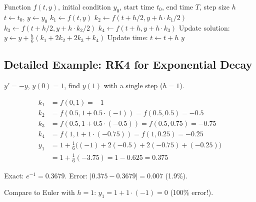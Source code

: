 \begin{algorithm}[H]
\caption{Classical Runge-Kutta Method (RK4)}
\begin{algorithmic}[1]
    \Require Function $f(t, y)$, initial condition $y_0$, start time $t_0$, end time $T$, step size $h$
    \State $t \gets t_0$, $y \gets y_0$
        \State $k_1 \gets f(t, y)$
        \State $k_2 \gets f(t + h/2, y + h \cdot k_1/2)$
        \State $k_3 \gets f(t + h/2, y + h \cdot k_2/2)$
        \State $k_4 \gets f(t + h, y + h \cdot k_3)$
        \State Update solution: $y \gets y + \frac{h}{6}(k_1 + 2k_2 + 2k_3 + k_4)$
        \State Update time: $t \gets t + h$
    \EndWhile
    \Return $y$
\end{algorithmic}
\end{algorithm}


\subsection{Detailed Example: RK4 for Exponential Decay}

 $y' = -y$, $y(0) = 1$, find $y(1)$ with a single step ($h = 1$).

\begin{align*}
    k_1 &= f(0, 1) = -1 \\
    k_2 &= f(0.5, 1 + 0.5 \cdot (-1)) = f(0.5, 0.5) = -0.5 \\
    k_3 &= f(0.5, 1 + 0.5 \cdot (-0.5)) = f(0.5, 0.75) = -0.75 \\
    k_4 &= f(1, 1 + 1 \cdot (-0.75)) = f(1, 0.25) = -0.25 \\
    y_1 &= 1 + \frac{1}{6}\bigl((-1) + 2(-0.5) + 2(-0.75) + (-0.25)\bigr) \\
    &= 1 + \frac{1}{6}(-3.75) = 1 - 0.625 = 0.375
\end{align*}


Exact: $e^{-1} = 0.3679$. Error: $|0.375 - 0.3679| = 0.007$ (1.9\%).

Compare to Euler with $h=1$: $y_1 = 1 + 1 \cdot (-1) = 0$ (100\% error!).


